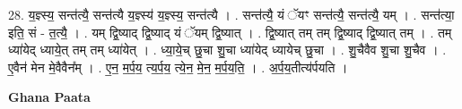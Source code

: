 \documentclass[17pt]{extarticle}
\begin{document}
28. य॒ज्ञ्स्य॒ सन्त॑त्यै॒ सन्त॑त्यै य॒ज्ञ्स्य॑ य॒ज्ञ्स्य॒ सन्त॑त्यै । . सन्त॑त्यै॒ यं ॅयꣳ सन्त॑त्यै॒ सन्त॑त्यै॒ यम् । . सन्त॑त्या॒ इति॒ सं - त॒त्यै॒ । . यम् द्वि॒ष्याद् द्वि॒ष्याद् यं ॅयम् द्वि॒ष्यात् । . द्वि॒ष्यात् तम् तम् द्वि॒ष्याद् द्वि॒ष्यात् तम् । . तम् ध्या॑येद् ध्याये॒त् तम् तम् ध्या॑येत् । . ध्या॒ये॒च् छु॒चा शु॒चा ध्या॑येद् ध्यायेच् छु॒चा । . शु॒चैवैव शु॒चा शु॒चैव । . ए॒वैन॑ मेन मे॒वैवैन᳚म् । . ए॒न॒ म॒र्प॒य॒ त्य॒र्प॒य॒ त्ये॒न॒ मे॒न॒ म॒र्प॒य॒ति॒ । . अ॒र्प॒य॒तीत्य॑र्पयति । \newline

\textbf{Ghana Paata } \newline
\end{document}
